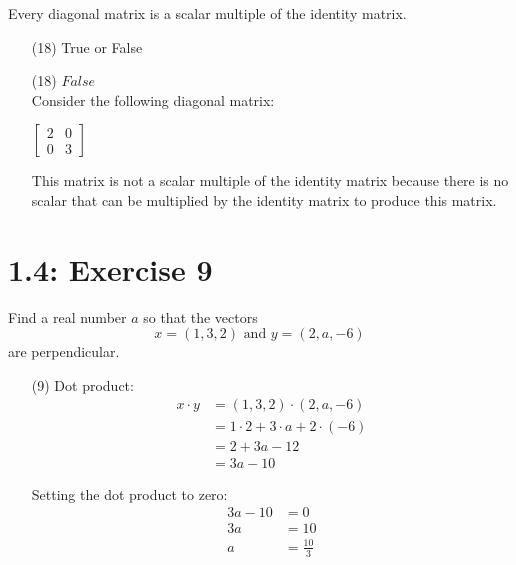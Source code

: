 \documentclass{report}
\begin{document}
Every diagonal matrix is a scalar multiple of the identity matrix.

\begin{enumerate}
    \item[(18)] True or False
    
\end{enumerate}

\sol 

\begin{enumerate}
\item[(18)]     
$ \boxed{False}$ \\
Consider the following diagonal matrix:

$
\begin{bmatrix}
2 & 0 \\
0 & 3
\end{bmatrix}
$

This matrix is not a scalar multiple of the identity matrix because there is no scalar that can be multiplied by the identity matrix to produce this matrix.
\end{enumerate}


\section*{1.4: Exercise 9} 

Find a real number $a$ so that the vectors
\[
x = (1,3,2) \text{ and } y = (2,a,-6)
\]
are perpendicular.\\


\sol 

\begin{enumerate}
\item[(9)]     
Dot product:
\begin{align*}
x \cdot y &= (1,3,2) \cdot (2,a,-6) \\
&= 1 \cdot 2 + 3 \cdot a + 2 \cdot (-6) \\
&= 2 + 3a - 12 \\
&= 3a - 10
\end{align*}

Setting the dot product to zero:
\begin{align*}
3a - 10 &= 0 \\
3a &= 10 \\
a &= \boxed{\frac{10}{3}}
\end{align*}
\end{enumerate}
\end{document}
